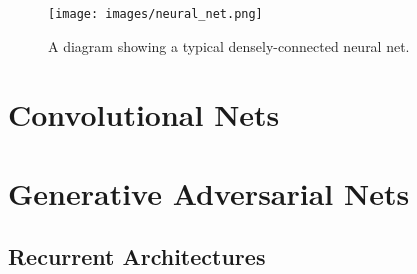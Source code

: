 \begin{figure}[t]
    \centering
    \texttt{[image: images/neural\_net.png]}
    \caption{A diagram showing a typical densely-connected neural net.}
    \label{neural_net}
\end{figure}

\section{Convolutional Nets}

\section{Generative Adversarial Nets}

\subsection*{Recurrent Architectures}